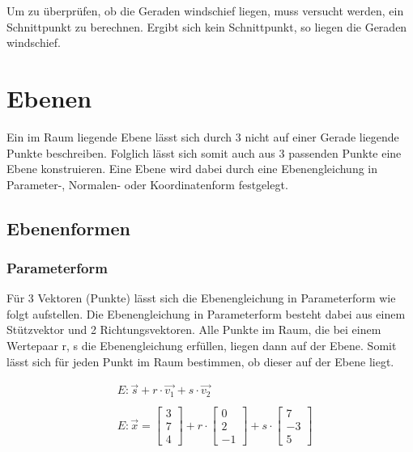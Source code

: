 Um zu überprüfen, ob die Geraden windschief liegen, muss versucht werden, ein Schnittpunkt
zu berechnen. Ergibt sich kein Schnittpunkt, so liegen die Geraden windschief.

\section{Ebenen}

Ein im Raum liegende Ebene lässt sich durch 3 nicht auf einer Gerade liegende Punkte
beschreiben. Folglich lässt sich somit auch aus 3 passenden Punkte eine Ebene konstruieren.
Eine Ebene wird dabei durch eine Ebenengleichung in Parameter-, Normalen- oder Koordinatenform
festgelegt.

\subsection{Ebenenformen}

\subsubsection{Parameterform}

Für 3 Vektoren (Punkte) lässt sich die Ebenengleichung in Parameterform wie folgt aufstellen.
Die Ebenengleichung in Parameterform besteht dabei aus einem Stützvektor und 2 Richtungsvektoren.
Alle Punkte im Raum, die bei einem Wertepaar r, s die Ebenengleichung erfüllen, liegen
dann auf der Ebene. Somit lässt sich für jeden Punkt im Raum bestimmen, ob dieser auf
der Ebene liegt.

\begin{align*}
    & E: \vec{s} + r \cdot \vec{v_1} + s \cdot \vec{v_2} \\
    \\
    & E: \vec{x} =
    \begin{bmatrix}
        3 \\
        7 \\
        4
    \end{bmatrix}
    +
    r \cdot
    \begin{bmatrix}
        0 \\
        2 \\
        -1
    \end{bmatrix}
    +
    s \cdot
    \begin{bmatrix}
        7 \\
        -3 \\
        5
    \end{bmatrix}
\end{align*}

